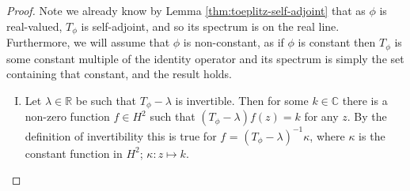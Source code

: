 \documentclass[../main.tex]{subfiles}
\begin{document}
\begin{proof}
Note we already know by Lemma \ref{thm:toeplitz-self-adjoint} that as $\phi$ is
real-valued, $T_\phi$ is self-adjoint, and so its spectrum is on the
real line. Furthermore, we will assume that $\phi$ is non-constant, as
if $\phi$ is constant then $T_\phi$ is some constant multiple of the
identity operator and its spectrum is simply the set containing that constant,
and the result holds. 
\begin{enumerate}[I.]
\item Let $\lambda \in \mathbb{R}$ be such that $T_\phi - \lambda$ is
invertible. Then for some $k \in \mathbb{C}$ there is a non-zero
function $f \in H^2$ such that $(T_\phi - \lambda)f(z) = k$ for
any $z$. By the definition of invertibility this is true for $f$
= $(T_\phi - \lambda)^{-1}\kappa$, where $\kappa$ is the
constant function in $H^2$; $\kappa : z \mapsto k$.


\end{enumerate}
\end{proof}
\end{document}
